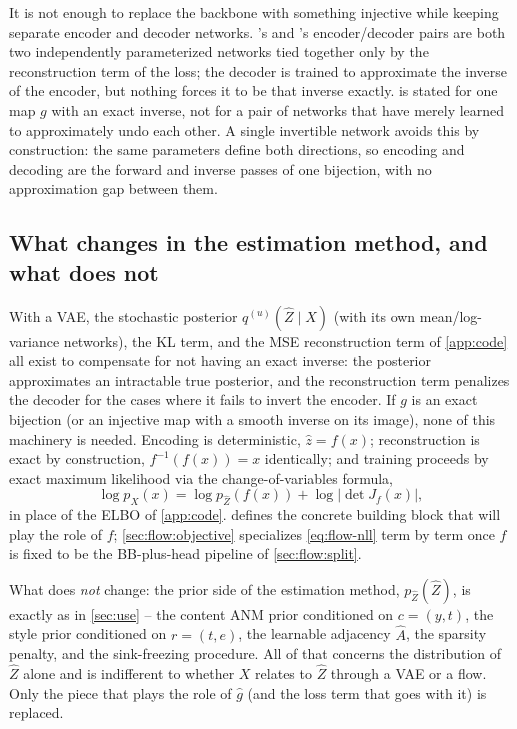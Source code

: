 It is not enough to replace the backbone with something injective while keeping separate encoder and
decoder networks. 's and 's encoder/decoder pairs are both two
independently parameterized networks tied together only by the reconstruction term of the loss; the
decoder is trained to approximate the inverse of the encoder, but nothing forces it to be that inverse
exactly.  is stated for one map $g$ with an exact inverse, not for a pair of networks that
have merely learned to approximately undo each other. A single invertible network avoids this by
construction: the same parameters define both directions, so encoding and decoding are the forward and
inverse passes of one bijection, with no approximation gap between them.

\subsection{What changes in the estimation method, and what does not}
\label{sec:flow:estimation}
With a VAE, the stochastic posterior $q^{(u)}(\hat Z\mid X)$ (with its own mean/log-variance networks),
the KL term, and the MSE reconstruction term of \cref{app:code} all exist to compensate for not having an
exact inverse: the posterior approximates an intractable true posterior, and the reconstruction term
penalizes the decoder for the cases where it fails to invert the encoder. If $g$ is an exact bijection
(or an injective map with a smooth inverse on its image), none of this machinery is needed. Encoding is
deterministic, $\hat z=f(x)$; reconstruction is exact by construction, $f^{-1}(f(x))=x$ identically; and
training proceeds by exact maximum likelihood via the change-of-variables formula,
\begin{equation}
\log p_X(x) = \log p_{\hat Z}(f(x)) + \log\bigl|\det J_f(x)\bigr|,
\label{eq:flow-nll}
\end{equation}
in place of the ELBO of \cref{app:code}.  defines the concrete building block
that will play the role of $f$; \cref{sec:flow:objective} specializes \cref{eq:flow-nll} term by term
once $f$ is fixed to be the BB-plus-head pipeline of \cref{sec:flow:split}.

What does \emph{not} change: the prior side of the estimation method, $p_{\hat Z}(\hat Z)$, is exactly as
in \cref{sec:use} -- the content ANM prior conditioned on $c=(y,t)$, the style prior conditioned on
$r=(t,e)$, the learnable adjacency $\hat A$, the sparsity penalty, and the sink-freezing procedure. All
of that concerns the distribution of $\hat Z$ alone and is indifferent to whether $X$ relates to $\hat Z$
through a VAE or a flow. Only the piece that plays the role of $\hat g$ (and the loss term that goes with
it) is replaced.

